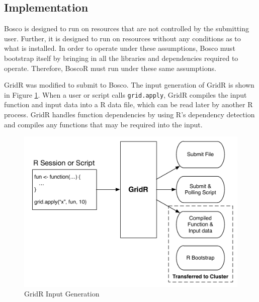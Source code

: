 \subsection{Implementation}
\label{sec:boscorimplementation}


Bosco is designed to run on resources that are not controlled by the submitting user.  Further, it is designed to run on resources without any conditions as to what is installed.  In order to operate under these assumptions, Bosco must bootstrap itself by bringing in all the libraries and dependencies required to operate.  Therefore, BoscoR must run under these same assumptions.

GridR was modified to submit to Bosco.  The input generation of GridR is shown in Figure \ref{fig:gridrinput}.  When a user or script calls \texttt{grid.apply}, GridR compiles the input function and input data into a R data file, which can be read later by another R process.  GridR handles function dependencies by using R's dependency detection and compiles any functions that may be required into the input.  

\begin{figure}[h!t]
\centering
\includegraphics[width=\textwidth]{BoscoRImages/InputDiagram.pdf}
\caption{GridR Input Generation}
\label{fig:gridrinput}
\end{figure}

